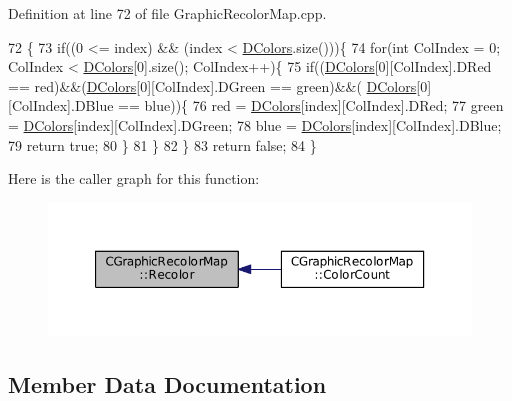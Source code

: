 Definition at line 72 of file Graphic\+Recolor\+Map.\+cpp.


\begin{DoxyCode}
72                                                                                    \{
73     \textcolor{keywordflow}{if}((0 <= index) && (index < \hyperlink{classCGraphicRecolorMap_a9dea9a9e96e4465a53a40c4a34cebf71}{DColors}.size()))\{
74         \textcolor{keywordflow}{for}(\textcolor{keywordtype}{int} ColIndex = 0; ColIndex < \hyperlink{classCGraphicRecolorMap_a9dea9a9e96e4465a53a40c4a34cebf71}{DColors}[0].size(); ColIndex++)\{
75             \textcolor{keywordflow}{if}((\hyperlink{classCGraphicRecolorMap_a9dea9a9e96e4465a53a40c4a34cebf71}{DColors}[0][ColIndex].DRed == red)&&(\hyperlink{classCGraphicRecolorMap_a9dea9a9e96e4465a53a40c4a34cebf71}{DColors}[0][ColIndex].DGreen == green)&&(
      \hyperlink{classCGraphicRecolorMap_a9dea9a9e96e4465a53a40c4a34cebf71}{DColors}[0][ColIndex].DBlue == blue))\{
76                 red = \hyperlink{classCGraphicRecolorMap_a9dea9a9e96e4465a53a40c4a34cebf71}{DColors}[index][ColIndex].DRed;
77                 green = \hyperlink{classCGraphicRecolorMap_a9dea9a9e96e4465a53a40c4a34cebf71}{DColors}[index][ColIndex].DGreen;
78                 blue = \hyperlink{classCGraphicRecolorMap_a9dea9a9e96e4465a53a40c4a34cebf71}{DColors}[index][ColIndex].DBlue;
79                 \textcolor{keywordflow}{return} \textcolor{keyword}{true};
80             \}
81         \}
82     \}
83     \textcolor{keywordflow}{return} \textcolor{keyword}{false};
84 \}
\end{DoxyCode}
Here is the caller graph for this function\+:
\nopagebreak
\begin{figure}[H]
\begin{center}
\leavevmode
\includegraphics[width=350pt]{classCGraphicRecolorMap_a338087373145b89a29902b50276358d1_icgraph}
\end{center}
\end{figure}


\subsection{Member Data Documentation}
\hypertarget{classCGraphicRecolorMap_a9dea9a9e96e4465a53a40c4a34cebf71}{}\label{classCGraphicRecolorMap_a9dea9a9e96e4465a53a40c4a34cebf71} 
